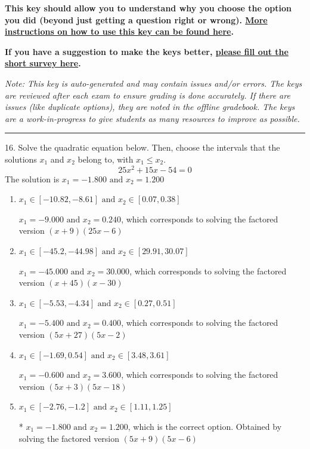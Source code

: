 \documentclass{extbook}[14pt]
\begin{document}
\textbf{This key should allow you to understand why you choose the option you did (beyond just getting a question right or wrong). \href{https://xronos.clas.ufl.edu/mac1105spring2020/courseDescriptionAndMisc/Exams/LearningFromResults}{More instructions on how to use this key can be found here}.}

\textbf{If you have a suggestion to make the keys better, \href{https://forms.gle/CZkbZmPbC9XALEE88}{please fill out the short survey here}.}

\textit{Note: This key is auto-generated and may contain issues and/or errors. The keys are reviewed after each exam to ensure grading is done accurately. If there are issues (like duplicate options), they are noted in the offline gradebook. The keys are a work-in-progress to give students as many resources to improve as possible.}

\rule{\textwidth}{0.4pt}

16. Solve the quadratic equation below. Then, choose the intervals that the solutions $x_1$ and $x_2$ belong to, with $x_1 \leq x_2$.
\[ 25x^{2} +15 x -54 = 0 \] 
The solution is $ x_1 = -1.800 \text{ and } x_2 = 1.200 $ 

\begin{enumerate}[label=\Alph*.] 
\item $ x_1 \in [-10.82, -8.61] \text{ and } x_2 \in [0.07, 0.38] $ 

 $x_1 = -9.000 \text{ and } x_2 = 0.240$, which corresponds to solving the factored version $(x + 9)(25x -6)$ 
\item $ x_1 \in [-45.2, -44.98] \text{ and } x_2 \in [29.91, 30.07] $ 

 $x_1 = -45.000 \text{ and } x_2 = 30.000$, which corresponds to solving the factored version $(x + 45)(x -30)$ 
\item $ x_1 \in [-5.53, -4.34] \text{ and } x_2 \in [0.27, 0.51] $ 

 $x_1 = -5.400 \text{ and } x_2 = 0.400$, which corresponds to solving the factored version $(5x + 27)(5x -2)$ 
\item $ x_1 \in [-1.69, 0.54] \text{ and } x_2 \in [3.48, 3.61] $ 

 $x_1 = -0.600 \text{ and } x_2 = 3.600$, which corresponds to solving the factored version $(5x + 3)(5x -18)$ 
\item $ x_1 \in [-2.76, -1.2] \text{ and } x_2 \in [1.11, 1.25] $ 

 * $x_1 = -1.800 \text{ and } x_2 = 1.200$, which is the correct option. Obtained by solving the factored version $(5x + 9)(5x -6)$ 
\end{enumerate} 
 
\end{document}
